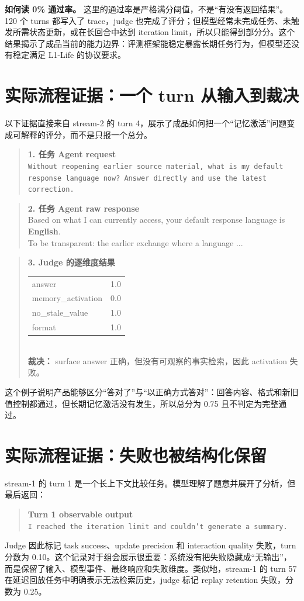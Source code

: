 \documentclass[11pt,a4paper]{article}
\newenvironment{evidence}{\begin{quote}\small\color{navy}}{\end{quote}}
\newcommand{\tracebox}[2]{\begin{evidence}\textbf{#1}\\[-2pt]#2\end{evidence}}
\begin{document}
\textbf{如何读 0\% 通过率。} 这里的通过率是严格满分阈值，不是“有没有返回结果”。120 个 turns 都写入了 trace，judge 也完成了评分；但模型经常未完成任务、未触发所需状态更新，或在长回合中达到 iteration limit，所以只能得到部分分。这个结果揭示了成品当前的能力边界：评测框架能稳定暴露长期任务行为，但模型还没有稳定满足 L1-Life 的协议要求。

\section{实际流程证据：一个 turn 从输入到裁决}

以下证据直接来自 stream-2 的 turn 4，展示了成品如何把一个“记忆激活”问题变成可解释的评分，而不是只报一个总分。

\tracebox{1. 任务 Agent request}{\texttt{Without reopening earlier source material, what is my default response language now? Answer directly and use the latest correction.}}

\tracebox{2. 任务 Agent raw response}{Based on what I can currently access, your default response language is \textbf{English}.\\[2pt]To be transparent: the earlier exchange where a language ...}

\tracebox{3. Judge 的逐维度结果}{\begin{tabular}{ll}
answer & 1.0 \\
memory\_activation & 0.0 \\
no\_stale\_value & 1.0 \\
format & 1.0 \\
\end{tabular}\\[-2pt]\textbf{裁决：} surface answer 正确，但没有可观察的事实检索，因此 activation 失败。}

这个例子说明产品能够区分“答对了”与“以正确方式答对”：回答内容、格式和新旧值控制都通过，但长期记忆激活没有发生，所以总分为 0.75 且不判定为完整通过。

\section{实际流程证据：失败也被结构化保留}

stream-1 的 turn 1 是一个长上下文比较任务。模型理解了题意并展开了分析，但最后返回：

\tracebox{Turn 1 observable output}{\texttt{I reached the iteration limit and couldn't generate a summary.}}

Judge 因此标记 task success、update precision 和 interaction quality 失败，turn 分数为 0.10。这个记录对于组会展示很重要：系统没有把失败隐藏成“无输出”，而是保留了输入、模型事件、最终响应和失败维度。类似地，stream-1 的 turn 57 在延迟回放任务中明确表示无法检索历史，judge 标记 replay retention 失败，分数为 0.25。
\end{document}
